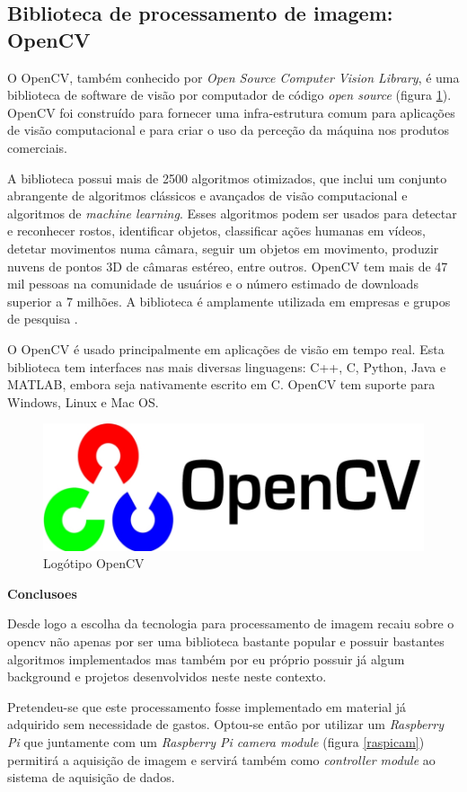 \subsection{Biblioteca de processamento de imagem: OpenCV}

O OpenCV, também conhecido por \textit{Open Source Computer Vision Library}, é uma biblioteca de software de visão por computador de código \textit{open source} (figura \ref{opencvlogo}). OpenCV foi construído para fornecer uma infra-estrutura comum para aplicações de visão computacional e para criar o uso da perceção da máquina nos produtos comerciais.

A biblioteca possui mais de 2500 algoritmos otimizados, que inclui um conjunto abrangente de algoritmos clássicos e avançados de visão computacional e algoritmos de \textit{machine learning}. Esses algoritmos podem ser usados para detectar e reconhecer rostos, identificar objetos, classificar ações humanas em vídeos, detetar movimentos numa câmara, seguir um objetos em movimento, produzir nuvens de pontos 3D de câmaras estéreo, entre outros.
OpenCV tem mais de 47 mil pessoas na comunidade de usuários e o número estimado de downloads superior a 7 milhões. A biblioteca é amplamente utilizada em empresas e grupos de pesquisa \cite{Itseez}.

O OpenCV é usado principalmente em aplicações de visão em tempo real. Esta biblioteca tem interfaces nas mais diversas linguagens: C++, C, Python, Java e MATLAB, embora seja nativamente escrito em C. OpenCV tem suporte para Windows, Linux e Mac OS\cite{Itseez}. 

\begin{figure}[!htb]
	\centering
	\includegraphics[width=0.5\linewidth]{img/vision/opencv_logo.jpg}
	\caption{Logótipo OpenCV}
	\label{opencvlogo}
\end{figure}


\textbf{Conclusoes} 

Desde logo a escolha da tecnologia para processamento de imagem recaiu sobre o opencv não apenas por ser uma biblioteca bastante popular e possuir bastantes algoritmos implementados mas também por eu próprio possuir já algum background e projetos desenvolvidos neste neste contexto.


Pretendeu-se que este processamento fosse implementado em material já adquirido sem necessidade de gastos. Optou-se então por utilizar um \textit{Raspberry Pi} que juntamente com um \textit{Raspberry Pi camera module} (figura \ref{raspicam}) permitirá a aquisição de imagem e servirá também como \textit{controller module} ao sistema de aquisição de dados. 


